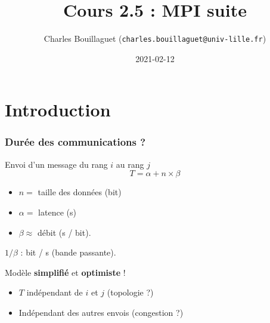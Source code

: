 \documentclass[xcolor={x11names,svgnames}]{beamer}
\author[C.~Bouillaguet]{Charles Bouillaguet \newline
  {\small (\texttt{charles.bouillaguet@univ-lille.fr})}}
\title{Cours 2.5 : MPI suite}
\date{2021-02-12}
\begin{document}
\section{Introduction}

\begin{frame}[label=title]
  \titlepage
\end{frame}


\begin{frame}
\frametitle{Durée des communications ?}

\begin{block}{Envoi d'un message du rang $i$ au rang $j$}
  \[
    T = \alpha + n \times \beta
  \]
  
  \begin{itemize}
  \item $n =$ taille des données (bit)
  \item $\alpha =$ \alert{latence} (s)
  \item $\beta \approx$ \alert{débit} (s / bit).
  \end{itemize}
\end{block}

\medskip

$1 / \beta$ : bit / s (\alert{bande passante}).

\medskip

\begin{alertblock}{Modèle \textbf{simplifié} et \textbf{optimiste} !}
\begin{itemize}
\item $T$ indépendant de $i$ et $j$ (topologie ?)
\item Indépendant des autres envois (congestion ?)
\end{itemize}
\end{alertblock}

\end{frame}

\end{document}
